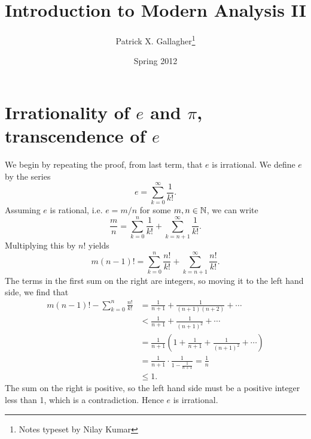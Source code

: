 \documentclass{mathnotes}
\title{Introduction to Modern Analysis II}
\author{Patrick X. Gallagher\footnote{Notes typeset by Nilay Kumar}}
\date{Spring 2012}
\begin{document}
\maketitle

\section{Irrationality of $e$ and $\pi$, transcendence of $e$}

We begin by repeating the proof, from last term, that $e$ is irrational.
We define $e$ by the series \[e=\sum_{k=0}^\infty \frac{1}{k!}.\]
Assuming $e$ is rational, i.e. $e=m/n$ for some $m,n\in\mathbb{N}$, we can write
\[\frac{m}{n}=\sum_{k=0}^n\frac{1}{k!}+\sum_{k=n+1}^\infty\frac{1}{k!}.\]
Multiplying this by $n!$ yields
\[m(n-1)!=\sum_{k=0}^n\frac{n!}{k!}+\sum^\infty_{k=n+1}\frac{n!}{k!}.\]
The terms in the first sum on the right are integers, so moving it to the left
hand side, we find that
\begin{align*}
    m(n-1)!-\sum_{k=0}^n\frac{n!}{k!} &= \frac{1}{n+1}+\frac{1}{(n+1)(n+2)}+\cdots\\
    &<\frac{1}{n+1}+\frac{1}{(n+1)^2}+\cdots\\
    &=\frac{1}{n+1}\left( 1+\frac{1}{n+1}+\frac{1}{(n+1)^2}+\cdots \right)\\
    &=\frac{1}{n+1}\cdot \frac{1}{1-\frac{1}{n+1}}=\frac{1}{n}\\
    &\leq 1.
\end{align*}
The sum on the right is positive, so the left hand side must be a positive integer
less than 1, which is a contradiction. Hence $e$ is irrational.
\end{document}
